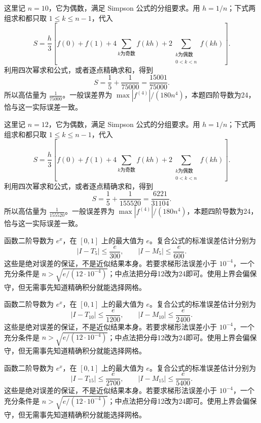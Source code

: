 \documentclass[12pt,fontset=fandol]{ctexart}
\begin{document}
\begin{solve}\label{ans:c18q11}
这里记 $n=10$，它为偶数，满足 Simpson 公式的分组要求。用 $h=1/n$；下式两组求和都只取 $1\le k\le n-1$，代入
\[
S=\frac h3\left[f(0)+f(1)+4\sum_{k\text{为奇数}}f(kh)+2\sum_{\substack{k\text{为偶数}\\0<k<n}}f(kh)\right].
\]
利用四次幂求和公式，或者逐点精确求和，得到
\[
S=\frac15+\frac{1}{75000}=\frac{15001}{75000}.
\]
所以高估量为 $\frac{1}{75000}$。一般误差界为 $\max|f^{(4)}|/(180n^4)$，本题四阶导数为24，恰与这一实际误差一致。
\end{solve}

\begin{solve}\label{ans:c18q12}
这里记 $n=12$，它为偶数，满足 Simpson 公式的分组要求。用 $h=1/n$；下式两组求和都只取 $1\le k\le n-1$，代入
\[
S=\frac h3\left[f(0)+f(1)+4\sum_{k\text{为奇数}}f(kh)+2\sum_{\substack{k\text{为偶数}\\0<k<n}}f(kh)\right].
\]
利用四次幂求和公式，或者逐点精确求和，得到
\[
S=\frac15+\frac{1}{155520}=\frac{6221}{31104}.
\]
所以高估量为 $\frac{1}{155520}$。一般误差界为 $\max|f^{(4)}|/(180n^4)$，本题四阶导数为24，恰与这一实际误差一致。
\end{solve}

\begin{solve}\label{ans:c18q13}
函数二阶导数为 $e^x$，在 $[0,1]$ 上的最大值为 $e$。复合公式的标准误差估计分别为
\[
|I-T_{5}|\le\frac e{300},\qquad |I-M_{5}|\le\frac e{600}.
\]
这些是绝对误差的保证，不是近似结果本身。若要求梯形法误差小于 $10^{-4}$，一个充分条件是 $n>\sqrt{e/(12\cdot10^{-4})}$；中点法把分母12改为24即可。使用上界会偏保守，但无需事先知道精确积分就能选择网格。
\end{solve}

\begin{solve}\label{ans:c18q14}
函数二阶导数为 $e^x$，在 $[0,1]$ 上的最大值为 $e$。复合公式的标准误差估计分别为
\[
|I-T_{10}|\le\frac e{1200},\qquad |I-M_{10}|\le\frac e{2400}.
\]
这些是绝对误差的保证，不是近似结果本身。若要求梯形法误差小于 $10^{-4}$，一个充分条件是 $n>\sqrt{e/(12\cdot10^{-4})}$；中点法把分母12改为24即可。使用上界会偏保守，但无需事先知道精确积分就能选择网格。
\end{solve}

\begin{solve}\label{ans:c18q15}
函数二阶导数为 $e^x$，在 $[0,1]$ 上的最大值为 $e$。复合公式的标准误差估计分别为
\[
|I-T_{15}|\le\frac e{2700},\qquad |I-M_{15}|\le\frac e{5400}.
\]
这些是绝对误差的保证，不是近似结果本身。若要求梯形法误差小于 $10^{-4}$，一个充分条件是 $n>\sqrt{e/(12\cdot10^{-4})}$；中点法把分母12改为24即可。使用上界会偏保守，但无需事先知道精确积分就能选择网格。
\end{solve}
\end{document}
